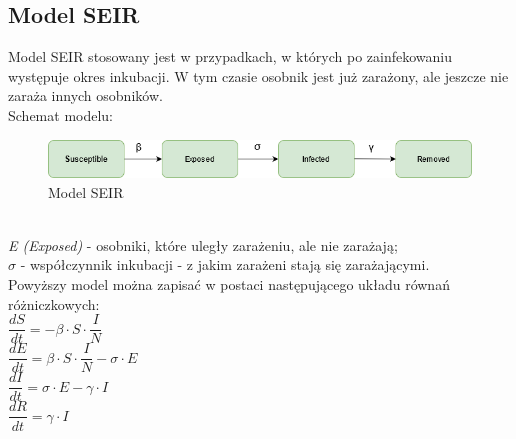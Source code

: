 \documentclass[12pt,a4paper]{article}
\begin{document}
\subsection{Model SEIR}
Model SEIR stosowany jest w przypadkach, w których po zainfekowaniu występuje okres inkubacji. W tym czasie osobnik jest już zarażony, ale jeszcze nie zaraża innych osobników.\\
Schemat modelu:
\begin{figure}[h!]
\centering
\includegraphics[width=1.0\textwidth]{Schematy/SEIR}
\caption{Model SEIR} 
\label{fig:Model SEIR}
\end{figure}\\
\textit{E (Exposed)} - osobniki, które uległy zarażeniu, ale nie zarażają;\\
\textit{ $\sigma$ } - współczynnik inkubacji - z jakim zarażeni stają się zarażającymi.\\
Powyższy model można zapisać w postaci następującego układu równań różniczkowych:\\
$\dfrac{dS}{dt} = - \beta\cdot{S}\cdot\dfrac{I}{N}$\\
$\dfrac{dE}{dt} = \beta\cdot{S}\cdot\dfrac{I}{N} - \sigma\cdot{E}$\\
$\dfrac{dI}{dt} = \sigma\cdot{E} - \gamma\cdot{I}$\\
$\dfrac{dR}{dt} = \gamma\cdot{I}$
\end{document}
